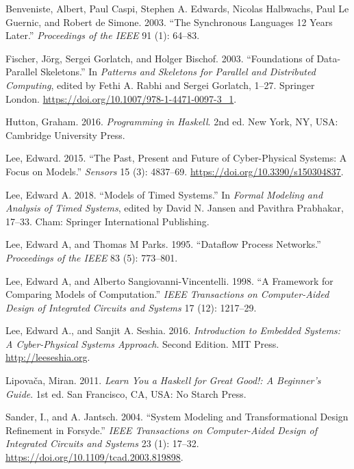 \documentclass[
  a4paper,
]{article}
\begin{document}
\leavevmode\hypertarget{ref-Benveniste03}{}%
Benveniste, Albert, Paul Caspi, Stephen A. Edwards, Nicolas Halbwachs,
Paul Le Guernic, and Robert de Simone. 2003. ``The Synchronous Languages
12 Years Later.'' \emph{Proceedings of the IEEE} 91 (1): 64--83.

\leavevmode\hypertarget{ref-Fischer-2003}{}%
Fischer, Jörg, Sergei Gorlatch, and Holger Bischof. 2003. ``Foundations
of Data-Parallel Skeletons.'' In \emph{Patterns and Skeletons for
Parallel and Distributed Computing}, edited by Fethi A. Rabhi and Sergei
Gorlatch, 1--27. Springer London.
\url{https://doi.org/10.1007/978-1-4471-0097-3_1}.

\leavevmode\hypertarget{ref-hutton-2016}{}%
Hutton, Graham. 2016. \emph{Programming in Haskell}. 2nd ed. New York,
NY, USA: Cambridge University Press.

\leavevmode\hypertarget{ref-lee-2015}{}%
Lee, Edward. 2015. ``The Past, Present and Future of Cyber-Physical
Systems: A Focus on Models.'' \emph{Sensors} 15 (3): 4837--69.
\url{https://doi.org/10.3390/s150304837}.

\leavevmode\hypertarget{ref-Lee18}{}%
Lee, Edward A. 2018. ``Models of Timed Systems.'' In \emph{Formal
Modeling and Analysis of Timed Systems}, edited by David N. Jansen and
Pavithra Prabhakar, 17--33. Cham: Springer International Publishing.

\leavevmode\hypertarget{ref-lee95}{}%
Lee, Edward A, and Thomas M Parks. 1995. ``Dataflow Process Networks.''
\emph{Proceedings of the IEEE} 83 (5): 773--801.

\leavevmode\hypertarget{ref-lee98}{}%
Lee, Edward A, and Alberto Sangiovanni-Vincentelli. 1998. ``A Framework
for Comparing Models of Computation.'' \emph{IEEE Transactions on
Computer-Aided Design of Integrated Circuits and Systems} 17 (12):
1217--29.

\leavevmode\hypertarget{ref-leeseshia-15}{}%
Lee, Edward A., and Sanjit A. Seshia. 2016. \emph{Introduction to
Embedded Systems: A Cyber-Physical Systems Approach}. Second Edition.
MIT Press. \url{http://leeseshia.org}.

\leavevmode\hypertarget{ref-Lipovaca11}{}%
Lipovača, Miran. 2011. \emph{Learn You a Haskell for Great Good!: A
Beginner's Guide}. 1st ed. San Francisco, CA, USA: No Starch Press.

\leavevmode\hypertarget{ref-sander-2004}{}%
Sander, I., and A. Jantsch. 2004. ``System Modeling and Transformational
Design Refinement in Forsyde.'' \emph{IEEE Transactions on
Computer-Aided Design of Integrated Circuits and Systems} 23 (1):
17--32. \url{https://doi.org/10.1109/tcad.2003.819898}.
\end{document}
